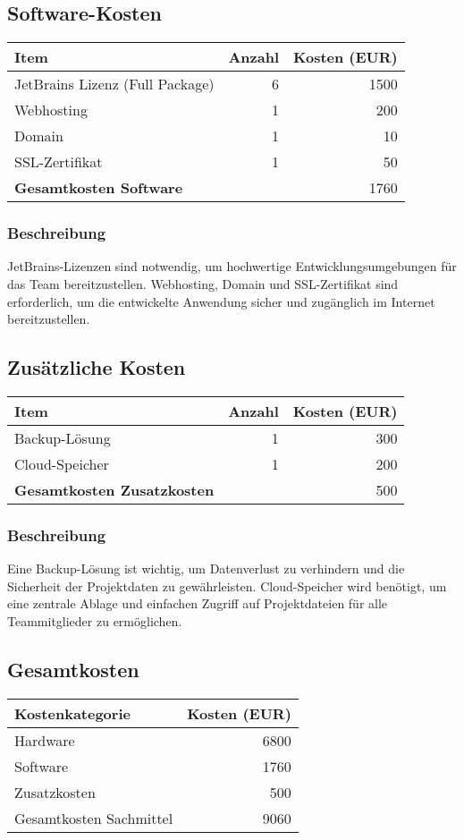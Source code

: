 \subsection*{Software-Kosten}
\begin{tabular}{lrr}
  \toprule
  \textbf{Item} & \textbf{Anzahl} & \textbf{Kosten (EUR)} \\
  \midrule
  JetBrains Lizenz (Full Package) & 6 & 1500 \\
  Webhosting & 1 & 200 \\
  Domain & 1 & 10 \\
  SSL-Zertifikat & 1 & 50 \\
  \midrule
  \textbf{Gesamtkosten Software} & & 1760 \\
  \bottomrule
\end{tabular}

\subsubsection*{Beschreibung}
JetBrains-Lizenzen sind notwendig, um hochwertige Entwicklungsumgebungen für das Team bereitzustellen. Webhosting, Domain und SSL-Zertifikat sind erforderlich, um die entwickelte Anwendung sicher und zugänglich im Internet bereitzustellen.

\subsection*{Zusätzliche Kosten}
\begin{tabular}{lrr}
  \toprule
  \textbf{Item} & \textbf{Anzahl} & \textbf{Kosten (EUR)} \\
  \midrule
  Backup-Lösung & 1 & 300 \\
  Cloud-Speicher & 1 & 200 \\
  \midrule
  \textbf{Gesamtkosten Zusatzkosten} & & 500 \\
  \bottomrule
\end{tabular}

\subsubsection*{Beschreibung}
Eine Backup-Lösung ist wichtig, um Datenverlust zu verhindern und die Sicherheit der Projektdaten zu gewährleisten. Cloud-Speicher wird benötigt, um eine zentrale Ablage und einfachen Zugriff auf Projektdateien für alle Teammitglieder zu ermöglichen.

\subsection*{Gesamtkosten}
\begin{tabular}{lr}
  \toprule
  \textbf{Kostenkategorie} & \textbf{Kosten (EUR)} \\
  \midrule
  Hardware & 6800 \\
  Software & 1760 \\
  Zusatzkosten & 500 \\
  \midrule
  Gesamtkosten Sachmittel & 9060 \\
  \bottomrule
\end{tabular}

